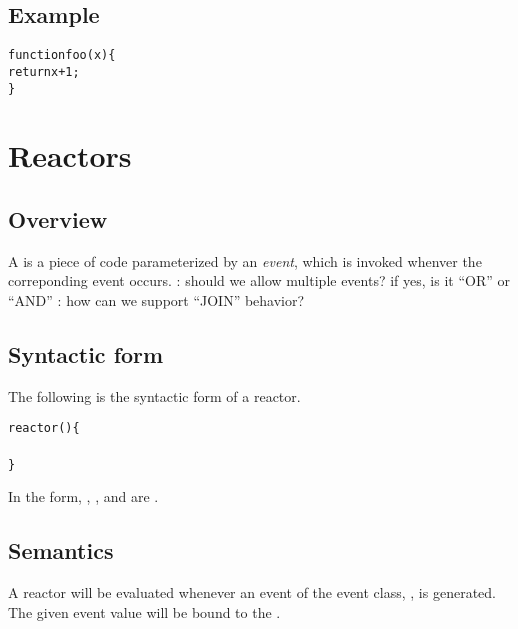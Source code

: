 \documentclass{note}\usepackage{mathptm,mydef}
\begin{document}
\subsection{Example}
\begin{alltt}
  \textcolor{red2}{function foo(x) \{
    return x + 1;
  \}}
\end{alltt}



\section{Reactors}
\subsection{Overview}
A  is a piece of code parameterized by an {\em event\/},
which is invoked whenver the correponding event occurs. 
\bit
\w {}: should we allow multiple events? if yes, is it ``OR'' or ``AND''
\w {}: how can we support ``JOIN'' behavior?
\eit

\subsection{Syntactic form}
The following is the syntactic form of a reactor.
\begin{alltt}
  \textcolor{red2}{reactor \textrm{}(\textrm{} \textrm{}) \{
    \textrm{}
  \}}
\end{alltt}
In the form, , , and 
are .

\subsection{Semantics}
A reactor will be evaluated whenever an event of the event class, 
, is generated. The given event value will be bound to 
the . 
\end{document}
